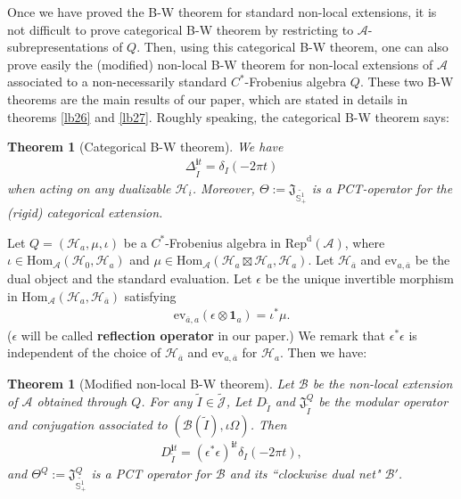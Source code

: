 \documentclass[12pt,a4paper]{article}
\theoremstyle{definition}
\theoremstyle{plain}
\newtheorem{thm}[df]{Theorem}
\newcommand{\fk}{\mathfrak}
\newcommand{\mc}{\mathcal}
\newcommand{\wtd}{\widetilde}
\newcommand{\ovl}{\overline}
\newcommand{\id}{\mathbf{1}}
\newcommand{\Hom}{\mathrm{Hom}}
\newcommand{\ev}{\mathrm{ev}}
\newcommand{\Jtd}{\widetilde{\mathcal J}}
\newcommand{\im}{\mathbf{i}}
\newcommand{\RepdA}{\mathrm{Rep}^{\mathrm d}(\mc A)}
\newcommand{\mbb}{\mathbb}
\numberwithin{equation}{section}
\begin{document}
Once we have proved the B-W theorem for standard non-local extensions, it is not difficult to prove categorical B-W theorem by restricting to $\mc A$-subrepresentations of $Q$. Then, using this categorical B-W theorem, one can also prove easily   the (modified) non-local B-W theorem for non-local extensions of $\mc A$ associated to a non-necessarily standard $C^*$-Frobenius algebra $Q$. These two B-W theorems are the main results of our paper, which are  stated in details in theorems \ref{lb26} and \ref{lb27}. Roughly speaking, the categorical B-W theorem says:
\begin{thm}[Categorical B-W theorem]\label{lb02}
We have
\begin{align}
\Delta_{\wtd I}^{\im t}=\delta_I(-2\pi t)\label{eq01}
\end{align}
when acting on any dualizable $\mc H_i$. Moreover, $\Theta:=\fk J_{\wtd{\mbb S^1_+}}$ is a PCT-operator for the (rigid) categorical extension.
\end{thm}
Let $Q=(\mc H_a,\mu,\iota)$ be a $C^*$-Frobenius algebra in $\RepdA$, where $\iota\in\Hom_{\mc A}(\mc H_0,\mc H_a)$ and $\mu\in\Hom_{\mc A}(\mc H_a\boxtimes\mc H_a,\mc H_a)$. Let $\mc H_{\ovl a}$ and $\ev_{a,\ovl a}$ be the dual object and the standard evaluation. Let $\epsilon$ be the unique invertible morphism in $\Hom_{\mc A}(\mc H_a,\mc H_{\ovl a})$ satisfying
\begin{align*}
\ev_{\ovl a,a}(\epsilon\otimes\id_a)=\iota^*\mu.
\end{align*}
($\epsilon$ will be called \textbf{reflection operator} in our paper.) We remark that $\epsilon^*\epsilon$ is independent of the choice of $\mc H_{\ovl a}$ and $\ev_{a,\ovl a}$ for $\mc H_a$. Then we have:
\begin{thm}[Modified non-local B-W theorem]\label{lb01}
Let $\mc B$ be the non-local extension of $\mc A$	obtained through $Q$. For any $\wtd I\in\Jtd$, Let $D_{\wtd I}$ and $\fk J^Q_{\wtd I}$ be the modular operator and conjugation associated to $(\mc B(\wtd I),\iota\Omega)$. Then
\begin{align}
D_{\wtd I}^{\im t}=(\epsilon^*\epsilon)^{\im t}\delta_I(-2\pi t),\label{eq02}
\end{align}
and $\Theta^Q:=\fk J^Q_{\wtd{\mbb S^1_+}}$ is a PCT operator for $\mc B$ and its ``clockwise dual net" $\mc B'$.
\end{thm}	
\end{document}
